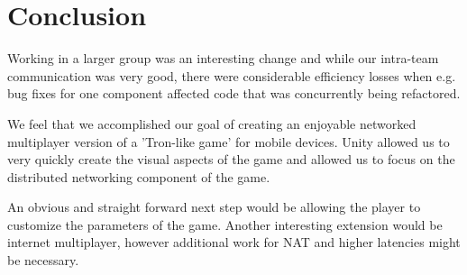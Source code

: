 \documentclass{report}
\begin{document}
 \balancecolumns
 
\section{Conclusion}
 Working in a larger group was an interesting change and while our intra-team communication was very good, there were considerable efficiency losses when e.g. bug fixes for one component affected code that was concurrently being refactored. 

 We feel that we accomplished our goal of creating an enjoyable  networked multiplayer version of a 'Tron-like game' for mobile devices. Unity allowed us to very quickly create the visual aspects of the game and allowed us to focus on the distributed networking component of the game.

An obvious and straight forward next step would be allowing the  player to customize the parameters of the game. Another interesting extension would be internet multiplayer, however additional work for NAT and higher latencies might be necessary.



 \balancecolumns
\end{document}
